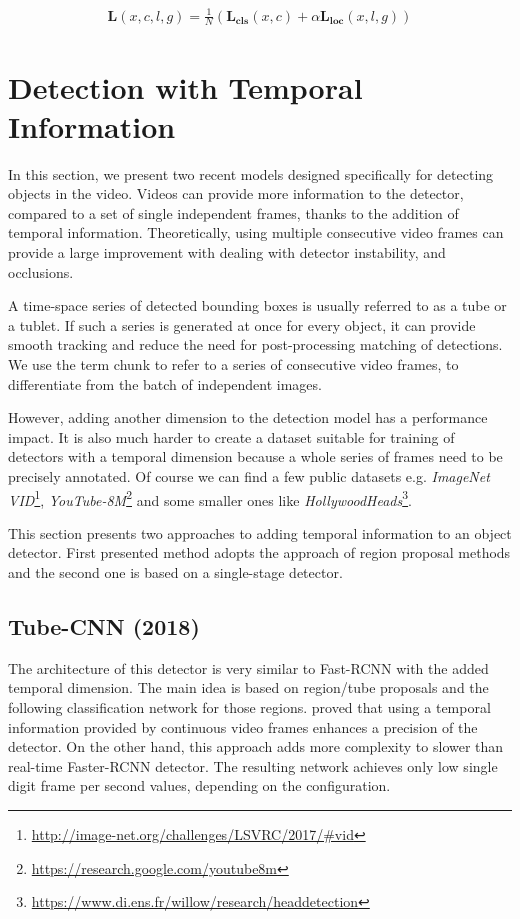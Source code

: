 \begin{align*}
\mathbf{L}(x,c,l,g) = \frac{1}{N}(\mathbf{L_{\text{cls}}}(x,c) + \alpha\mathbf{L_{\text{loc}}}(x,l,g))
\end{align*}

\section{Detection with Temporal Information}
\label{sec:video_det}
In this section, we present two recent models designed specifically for detecting objects in the video. Videos can provide more information to the detector, compared to a set of single independent frames, thanks to the addition of temporal information. Theoretically, using multiple consecutive video frames can provide a large improvement with dealing with detector instability, and occlusions. 

A time-space series of detected bounding boxes is usually referred to as a tube or a tublet. If such a series is generated at once for every object, it can provide smooth tracking and reduce the need for post-processing matching of detections. We use the term chunk to refer to a series of consecutive video frames, to differentiate from the batch of independent images.

However, adding another dimension to the detection model has a performance impact. It is also much harder to create a dataset suitable for training of detectors with a temporal dimension because a whole series of frames need to be precisely annotated. Of course we can find a few public datasets e.g. \textit{ImageNet VID}\footnote{\url{http://image-net.org/challenges/LSVRC/2017/\#vid}}, \textit{YouTube-8M}\footnote{\url{https://research.google.com/youtube8m}} and some smaller ones like \textit{HollywoodHeads}\footnote{\url{https://www.di.ens.fr/willow/research/headdetection}}.

This section presents two approaches to adding temporal information to an object detector. First presented method adopts the approach of region proposal methods and the second one is based on a single-stage detector.


\subsection{Tube-CNN (2018)}
\label{sed:tubecnn}
The architecture of this detector is very similar to Fast-RCNN with the added temporal dimension. The main idea is based on region/tube proposals and the following classification network for those regions. \citeauthor{bib:tubeCNN} \cite{bib:tubeCNN} proved that using a temporal information provided by continuous video frames enhances a precision of the detector. On the other hand, this approach adds more complexity to slower than real-time Faster-RCNN detector. The resulting network achieves only low single digit frame per second values, depending on the configuration. 

